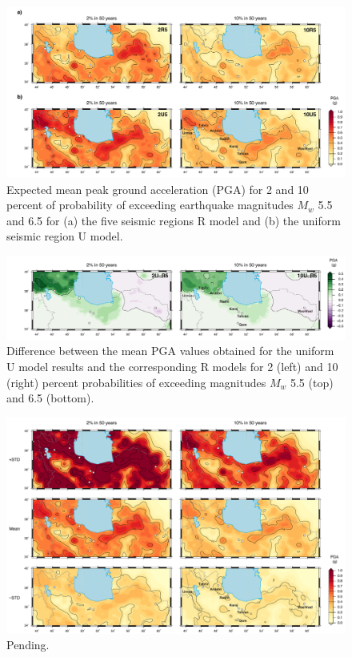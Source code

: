 \begin{figure}[t]
    \centering
    \includegraphics[width=\textwidth]{figures/pdf/figure-08.pdf} 
    \caption{Expected mean peak ground acceleration (PGA) for 2 and 10 percent of probability of exceeding earthquake magnitudes $M_w$ 5.5 and 6.5 for (a) the five seismic regions R model and (b) the uniform seismic region U model.}
    \label{fig:pga}
\end{figure}

\begin{figure}[t]
    \centering
    \includegraphics[width=\textwidth]{figures/pdf/figure-09.pdf} 
    \caption{Difference between the mean PGA values obtained for the uniform U model results and the corresponding R models for 2 (left) and 10 (right) percent probabilities of exceeding magnitudes $M_w$ 5.5 (top) and 6.5 (bottom).}
    \label{fig:pgadiff}
\end{figure}

\begin{figure}[t]
    \centering
    \includegraphics[width=\textwidth]{figures/pdf/figure-10.pdf} 
    \caption{Pending.}
    \label{fig:pgastd}
\end{figure}

